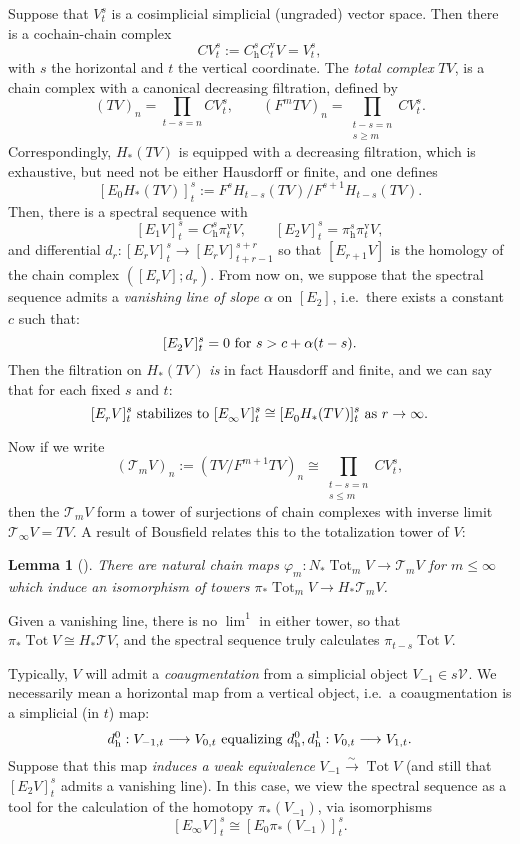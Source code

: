 \documentclass[11pt]{amsart} \renewcommand{\baselinestretch}{1.2}
\theoremstyle{plain}
\newtheorem{lem}[thm]{Lemma}
\theoremstyle{definition}
\DeclareMathOperator{\Tot}{Tot}
\let\phi\varphi
\renewcommand{\to}{\longrightarrow}
\newcommand{\calT}{\mathcal{T}}
\newcommand{\calV}{\mathcal{V}}
\newcommand{\vect}[2]{\calV^{#1}_{#2}}
\newcommand{\Edownup}[5]{[E_{#1}^{#2}#3]^{#4}_{#5}}
\newcommand{\uver}{^\mathrm{v}}
\newcommand{\dhor}{_\mathrm{h}}
\begin{document}
\begin{Conventions and notation}
\begin{shaded}\tiny
Suppose that $V^{s}_{t}$ is a cosimplicial simplicial (ungraded) vector space. Then there is a cochain-chain complex 
\[CV^{s}_{t}:=C\dhor^{s}C\uver_{t}V=V^{s}_{t},\]
with $s$ the horizontal and $t$ the vertical coordinate. The \emph{total complex} $TV$, is a chain complex with a canonical decreasing filtration, defined by 
\[(TV)_n=\prod_{t-s=n}CV^{s}_{t},\qquad(F^mTV)_n=\prod_{\substack{t-s=n\\s\geq m}}CV^{s}_{t}.\]
Correspondingly, $H_*( TV)$ is equipped with a decreasing filtration, which is exhaustive, but need not be either Hausdorff or finite, and one defines
\[\Edownup{0}{}{H_*( TV)}{s}{t}:=F^{s}H_{t-s}( TV)/F^{s+1}   H_{t-s}( TV).\]
Then, there is a spectral sequence with
\[\Edownup{1}{}{V}{s}{t}=C\dhor^{s}\pi\uver_{t}V,\qquad\Edownup{2}{}{V}{s}{t}=\pi\dhor^{s}\pi\uver_{t}V,\]
and differential $d_r:\Edownup{r}{}{V}{s}{t}\to \Edownup{r}{}{V}{s+r}{t+r-1}$ so that $\Edownup{r+1}{}{V}{}{}$ is the homology of the chain complex $(\Edownup{r}{}{V}{}{};d_r)$. From now on, we suppose that the spectral sequence admits a \emph{vanishing line of slope $\alpha$} on $\Edownup{2}{}{}{}{}$, i.e.\ there exists a constant $c$ such that:
\[\Edownup{2}{}{V}{s}{t}=0\textup{ for }s>c+\alpha(t-s).\]
Then the filtration on $H_*( TV)$ \emph{is} in fact Hausdorff and finite, and we can say that for each fixed $s$ and $t$:
\[\Edownup{r}{}{V}{s}{t}\textup{ stabilizes to }\Edownup{\infty}{}{V}{s}{t}\cong \Edownup{0}{}{H_*( TV)}{s}{t}\textup{ as $r\rightarrow\infty$}.\]



Now if we write
\[(\calT_mV)_n:=(TV/F^{m+1} TV)_n\cong\prod_{\substack{t-s=n\\s\leq m}}CV^{s}_{t}, \]
then the $\calT_mV$ form a tower of surjections of chain complexes with inverse limit $\calT_\infty V=TV$.  A result of Bousfield relates this to the totalization tower of $V$:
\begin{lem}[{\cite[Lemma 2.2]{BousfieldHSSCS.pdf}}]
There are natural chain maps $\phi_m:N_*\Tot_mV\to \calT_mV$ for $m\leq\infty$ which induce an isomorphism of towers $\pi_*\Tot_mV\to H_*\calT_mV$.
\end{lem}
\noindent Given a vanishing line, there is no $\lim^1$ in either tower, so that $\pi_*\Tot V\cong H_*\calT V$, and the spectral sequence truly calculates $\pi_{t-s} \Tot V$.

Typically, $V$ will admit a \emph{coaugmentation} from a simplicial object $V_{-1}\in s\vect{}{}$.  We necessarily mean a horizontal map from a vertical object, i.e.\ a coaugmentation is a simplicial (in $t$) map:
\[d\dhor^0:V_{-1,t}\to V_{0,t}\textup{ equalizing }d\dhor^0,d\dhor^1:V_{0,t}\to V_{1,t}.\]
Suppose that this map \emph{induces a weak equivalence} $V_{-1}\overset{\sim}{\to}\Tot V$ (and still that $\Edownup{2}{}{V}{s}{t}$ admits a vanishing line).
In this case, we view the spectral sequence as a tool for the calculation of the homotopy $\pi_*(V_{-1})$, via  isomorphisms
\[\Edownup{\infty}{}{V}{s}{t}\cong \Edownup{0}{}{\pi_*(V_{-1})}{s}{t}.\]


\end{shaded}
\end{Conventions and notation}
\end{document}
